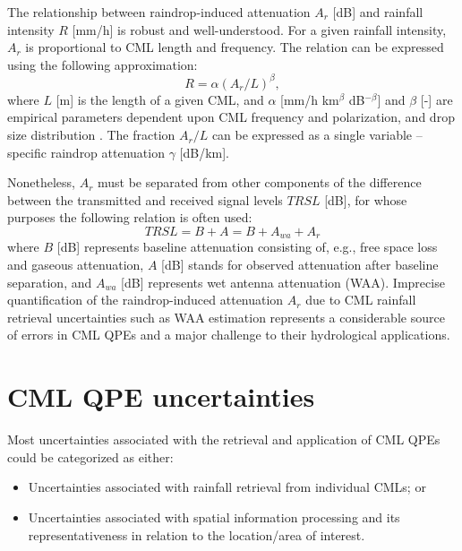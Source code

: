 \documentclass{ctuthesis}\usepackage[]{graphicx}\usepackage[]{color}
\begin{document}
The relationship between raindrop-induced attenuation $A_r$ [dB] and rainfall intensity $R$ [mm/h] is robust and well-understood. For a given rainfall intensity, $A_r$ is proportional to CML length and frequency. The relation can be expressed using the following approximation:
        \begin{equation} \label{eq:2eq1}
        R = \alpha (A_r / L)^\beta,
        \end{equation}
where $L$ [m] is the length of a given CML, and $\alpha$ [mm/h km$^\beta$ dB$^{-\beta}$] and $\beta$ [-] are empirical parameters dependent upon CML frequency and polarization, and drop size distribution \citep{olsenARbRelationCalculation1978}. The fraction $A_r / L$ can be expressed as a single variable -- specific raindrop attenuation $\gamma$ [dB/km].

Nonetheless, $A_r$ must be separated from other components of the difference between the transmitted and received signal levels $T\!R\!S\!L$ [dB], for whose purposes the following relation is often used: 
        \begin{equation} \label{eq:2eq2}
        T\!R\!S\!L = B + A = B + A_{wa} + A_r
        \end{equation}
where $B$ [dB] represents baseline attenuation consisting of, e.g., free space loss and gaseous attenuation, $A$ [dB] stands for observed attenuation after baseline separation, and $A_{wa}$ [dB] represents wet antenna attenuation (WAA). Imprecise quantification of the raindrop-induced attenuation $A_r$ due to CML rainfall retrieval uncertainties such as WAA estimation represents a considerable source of errors in CML QPEs  \citep{chwalaCommercialMicrowaveLink2019} and a major challenge to their hydrological applications.


\section{CML QPE uncertainties}

Most uncertainties associated with the retrieval and application of CML QPEs could be categorized as either: 
\begin{itemize}
        \item Uncertainties associated with rainfall retrieval from individual CMLs; or 
        \item Uncertainties associated with spatial information processing and its representativeness in relation to the location/area of interest.
\end{itemize}
\end{document}
